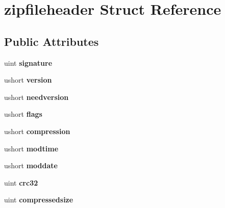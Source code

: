 \hypertarget{structzipfileheader}{}\section{zipfileheader Struct Reference}
\label{structzipfileheader}
\subsection*{Public Attributes}
\begin{DoxyCompactItemize}
\item 
\mbox{\label{structzipfileheader_a421b857b1af75ef50821612e16c67c71}} 
uint {\bfseries signature}
\item 
\mbox{\label{structzipfileheader_a9d53d0d20946386551f13f0ab58f2d51}} 
ushort {\bfseries version}
\item 
\mbox{\label{structzipfileheader_a72b7e403cfe35bdec468634f428cd007}} 
ushort {\bfseries needversion}
\item 
\mbox{\label{structzipfileheader_aa8cb1a170723ab34f0dec04f1eaaa0db}} 
ushort {\bfseries flags}
\item 
\mbox{\label{structzipfileheader_a758a192d03ddf3395a45b5c10fb6c1c7}} 
ushort {\bfseries compression}
\item 
\mbox{\label{structzipfileheader_ab3f6e7f7685c565c93d97e051b209b85}} 
ushort {\bfseries modtime}
\item 
\mbox{\label{structzipfileheader_a876f7dfebd765b096728d2217dd2ba1a}} 
ushort {\bfseries moddate}
\item 
\mbox{\label{structzipfileheader_a3fdfcdf32b804c1ddf676a0b65df1e2a}} 
uint {\bfseries crc32}
\item 
\mbox{\label{structzipfileheader_a65f76876a4133848b646ec02265cc84a}} 
uint {\bfseries compressedsize}
\item 
\mbox{\label{structzipfileheader_a0c9dcee7cadd51eb3cc03056ea8700e1}} 

\end{DoxyCompactItemize}
